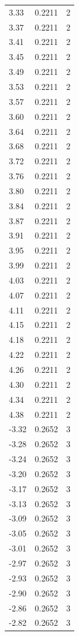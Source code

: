 \begin{longtable}{lrr}
  3.33 & 0.2211 & 2 \\
  3.37 & 0.2211 & 2 \\
  3.41 & 0.2211 & 2 \\
  3.45 & 0.2211 & 2 \\
  3.49 & 0.2211 & 2 \\
  3.53 & 0.2211 & 2 \\
  3.57 & 0.2211 & 2 \\
  3.60 & 0.2211 & 2 \\
  3.64 & 0.2211 & 2 \\
  3.68 & 0.2211 & 2 \\
  3.72 & 0.2211 & 2 \\
  3.76 & 0.2211 & 2 \\
  3.80 & 0.2211 & 2 \\
  3.84 & 0.2211 & 2 \\
  3.87 & 0.2211 & 2 \\
  3.91 & 0.2211 & 2 \\
  3.95 & 0.2211 & 2 \\
  3.99 & 0.2211 & 2 \\
  4.03 & 0.2211 & 2 \\
  4.07 & 0.2211 & 2 \\
  4.11 & 0.2211 & 2 \\
  4.15 & 0.2211 & 2 \\
  4.18 & 0.2211 & 2 \\
  4.22 & 0.2211 & 2 \\
  4.26 & 0.2211 & 2 \\
  4.30 & 0.2211 & 2 \\
  4.34 & 0.2211 & 2 \\
  4.38 & 0.2211 & 2 \\
  -3.32 & 0.2652 & 3 \\
  -3.28 & 0.2652 & 3 \\
  -3.24 & 0.2652 & 3 \\
  -3.20 & 0.2652 & 3 \\
  -3.17 & 0.2652 & 3 \\
  -3.13 & 0.2652 & 3 \\
  -3.09 & 0.2652 & 3 \\
  -3.05 & 0.2652 & 3 \\
  -3.01 & 0.2652 & 3 \\
  -2.97 & 0.2652 & 3 \\
  -2.93 & 0.2652 & 3 \\
  -2.90 & 0.2652 & 3 \\
  -2.86 & 0.2652 & 3 \\
  -2.82 & 0.2652 & 3 \\

\end{longtable}
